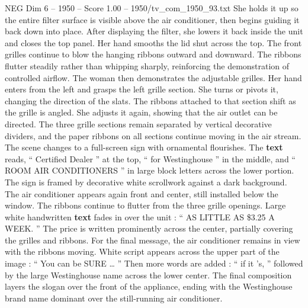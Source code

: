 \begin{textsample}{NEG Dim 6 – 1950 – Score 1.00 – 1950/tv\_com\_1950\_93.txt}
She holds it up so the entire filter surface is visible above the air conditioner, then begins guiding it back down into place.
After displaying the filter, she lowers it back inside the unit and closes the top panel.
Her hand smooths the lid shut across the top.
The front grilles continue to blow the hanging ribbons outward and downward.
The ribbons flutter steadily rather than whipping sharply, reinforcing the demonstration of controlled airflow.
The woman then demonstrates the adjustable grilles.
Her hand enters from the left and grasps the left grille section.
She turns or pivots it, changing the direction of the slats.
The ribbons attached to that section shift as the grille is angled.
She adjusts it again, showing that the air outlet can be directed.
The three grille sections remain separated by vertical decorative dividers, and the paper ribbons on all sections continue moving in the air stream.
The scene changes to a full-screen sign with ornamental flourishes.
The \textbf{text} reads, “ Certified Dealer ” at the top, “ for Westinghouse ” in the middle, and “ ROOM AIR CONDITIONERS ” in large block letters across the lower portion.
The sign is framed by decorative white scrollwork against a dark background.
The air conditioner appears again front and center, still installed below the window.
The ribbons continue to flutter from the three grille openings.
Large white handwritten \textbf{text} fades in over the unit : “ AS LITTLE AS \$3.25 A WEEK. ” The price is written prominently across the center, partially covering the grilles and ribbons.
For the final message, the air conditioner remains in view with the ribbons moving.
White script appears across the upper part of the image : “ You can be SURE … ” Then more words are added : “ if it ’s, ” followed by the large Westinghouse name across the lower center.
The final composition layers the slogan over the front of the appliance, ending with the Westinghouse brand name dominant over the still-running air conditioner.

\end{textsample}
